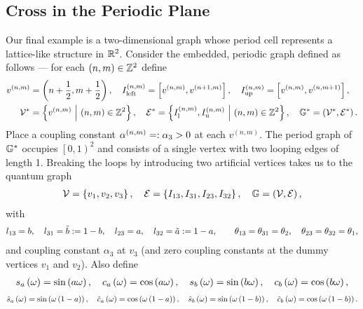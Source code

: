 \subsection{Cross in the Periodic Plane} \label{ssec:ExampleCrossInPlane}
Our final example is a two-dimensional graph whose period cell represents a lattice-like structure in $\mathbb{R}^2$.
Consider the embedded, periodic graph defined as follows --- for each $\left( n,m \right)\in\mathbb{Z}^2$ define
\begin{align*}
	v^{(n,m)} &= \left( n+\frac{1}{2}, m+\frac{1}{2} \right), \quad
	I_{\mathrm{left}}^{\left( n,m \right)} = \left[ v^{\left( n,m \right)}, v^{\left( n+1,m \right)} \right], \quad
	I_{\mathrm{up}}^{\left( n,m \right)} = \left[ v^{\left( n,m \right)}, v^{\left( n,m+1 \right)} \right], \\
	\mathcal{V}^* &= \left\{ v^{\left( n,m \right)} \ \middle\vert \  \left( n,m \right)\in\mathbb{Z}^2 \right\}, \quad
	\mathcal{E}^* = \left\{  I_{\mathrm{l}}^{\left( n,m \right)}, I_{\mathrm{u}}^{\left( n,m \right)} \ \middle\vert \  \left( n,m \right)\in\mathbb{Z}^2 \right\}, \quad
	\mathbb{G}^* = \left( \mathcal{V}^*, \mathcal{E}^* \right).
\end{align*}
Place a coupling constant $\alpha^{\left( n,m \right)} =: \alpha_3>0$ at each $v^{(n,m)}$.
The period graph of $\mathbb{G}^*$ occupies $\left[0,1\right)^2$ and consists of a single vertex with two looping edges of length 1.
Breaking the loops by introducing two artificial vertices takes us to the quantum graph
\begin{align*}
	\mathcal{V} = \left\{ v_1, v_2, v_3 \right\}, \quad
	\mathcal{E} = \left\{ I_{13}, I_{31}, I_{23}, I_{32} \right\}, \quad
	\mathbb{G} = \left( \mathcal{V}, \mathcal{E} \right),
\end{align*}
with
\begin{align*}
	l_{13} = b, \quad l_{31} = \tilde{b} := 1-b, \quad 
	l_{23} = a, \quad l_{32} = \tilde{a} := 1-a, \qquad
	\theta_{13} = \theta_{31} = \theta_2, \quad \theta_{23} = \theta_{32} = \theta_1,
\end{align*}
and coupling constant $\alpha_3$ at $v_3$ (and zero coupling constants at the dummy vertices $v_1$ and $v_2$).
Also define
\begin{align*}
	 s_a\left( \omega \right) = \sin\left( a\omega \right), \quad 
	 c_a\left( \omega \right) = \cos\left( a\omega \right), \quad 
	 s_b\left( \omega \right) = \sin\left( b\omega \right), \quad 
	 c_b\left( \omega \right) = \cos\left( b\omega \right),
\end{align*}
\begin{align*}
	 \tilde{s}_a\left( \omega \right) = \sin\left( \omega\left( 1-a \right) \right), \quad 
	 \tilde{c}_a\left( \omega \right) = \cos\left( \omega\left( 1-a \right) \right), \quad 
	 \tilde{s}_b\left( \omega \right) = \sin\left( \omega\left( 1-b \right) \right), \quad 
	 \tilde{c}_b\left( \omega \right) = \cos\left( \omega\left( 1-b \right) \right).
\end{align*}
